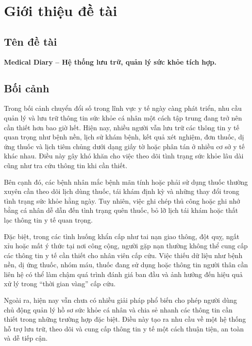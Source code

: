 \documentclass[12pt,a4paper]{report}
\begin{document}
\tableofcontents
\clearpage

\chapter{Giới thiệu đề tài}

\section{Tên đề tài}

\textbf{Medical Diary -- Hệ thống lưu trữ, quản lý sức khỏe tích hợp.}

\section{Bối cảnh}

Trong bối cảnh chuyển đổi số trong lĩnh vực y tế ngày càng phát triển, nhu cầu quản lý và lưu trữ thông tin sức khỏe cá nhân một cách tập trung đang trở nên cần thiết hơn bao giờ hết. Hiện nay, nhiều người vẫn lưu trữ các thông tin y tế quan trọng như bệnh nền, lịch sử khám bệnh, kết quả xét nghiệm, đơn thuốc, dị ứng thuốc và lịch tiêm chủng dưới dạng giấy tờ hoặc phân tán ở nhiều cơ sở y tế khác nhau. Điều này gây khó khăn cho việc theo dõi tình trạng sức khỏe lâu dài cũng như tra cứu thông tin khi cần thiết.

Bên cạnh đó, các bệnh nhân mắc bệnh mãn tính hoặc phải sử dụng thuốc thường xuyên cần theo dõi lịch dùng thuốc, tái khám định kỳ và những thay đổi trong tình trạng sức khỏe hằng ngày. Tuy nhiên, việc ghi chép thủ công hoặc ghi nhớ bằng cá nhân dễ dẫn đến tình trạng quên thuốc, bỏ lỡ lịch tái khám hoặc thất lạc thông tin y tế quan trọng.

Đặc biệt, trong các tình huống khẩn cấp như tai nạn giao thông, đột quỵ, ngất xỉu hoặc mất ý thức tại nơi công cộng, người gặp nạn thường không thể cung cấp các thông tin y tế cần thiết cho nhân viên cấp cứu. Việc thiếu dữ liệu như bệnh nền, dị ứng thuốc, nhóm máu, thuốc đang sử dụng hoặc thông tin người thân cần liên hệ có thể làm chậm quá trình đánh giá ban đầu và ảnh hưởng đến hiệu quả xử lý trong “thời gian vàng” cấp cứu.

Ngoài ra, hiện nay vẫn chưa có nhiều giải pháp phổ biến cho phép người dùng chủ động quản lý hồ sơ sức khỏe cá nhân và chia sẻ nhanh các thông tin cần thiết trong những trường hợp đặc biệt. Điều này tạo ra nhu cầu về một hệ thống hỗ trợ lưu trữ, theo dõi và cung cấp thông tin y tế một cách thuận tiện, an toàn và dễ tiếp cận.
\end{document}

